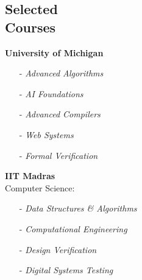 \documentclass[margin,line,letter]{resume}
\begin{document}
\begin{resume}
\section{\mysidestyle Selected\\Courses}
    \vspace{-0.04cm}
    \textbf{University of Michigan} \\
    \vspace{-0.7cm}
        \begin{multicols}{3}
        \begin{itemize}
        \item[-] \emph{Advanced Algorithms}
        \item[-] \emph{AI Foundations}
        \item[-] \emph{Advanced Compilers}
        \item[-] \emph{Web Systems}
        \item[-] \emph{Formal Verification}
        \end{itemize}
        \end{multicols}
    
    \vspace{-0.4cm}
    \textbf{IIT Madras}
        \vspace{0.15cm} \\
        \phantom{xx}\hspace{0ex} Computer Science:
        \vspace{-0.3cm}
        \begin{multicols}{2}
        \begin{itemize}
        \item[-] \emph{Data Structures \& Algorithms}
        \item[-] \emph{Computational Engineering}
        \item[-] \emph{Design Verification}
        \item[-] \emph{Digital Systems Testing}
        \end{itemize}
        \end{multicols}
        

\end{resume}
\end{document}
